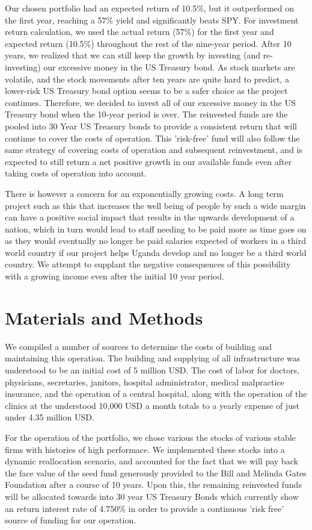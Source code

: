 \documentclass[10pt,twocolumn,twoside,final]{IEEEtran}
\begin{document}
Our chosen portfolio had an expected return of 10.5\%, but it outperformed on the first year, reaching a 57\% yield and significantly beats SPY. For investment return calculation, we used the actual return (57\%) for the first year and expected return (10.5\%) throughout the rest of the nine-year period. After 10 years, we realized that we can still keep the growth by investing (and re-investing) our excessive money in the US Treasury bond. As stock markets are volatile, and the stock movements after ten years are quite hard to predict, a lower-risk US Treasury bond option seems to be a safer choice as the project continues. Therefore, we decided to invest all of our excessive money in the US Treasury bond when the 10-year period is over. The reinvested funds are the pooled into 30 Year US Treasury bonds to provide a consistent return that will continue to cover the costs of operation. This 'risk-free' fund will also follow the same strategy of covering costs of operation and subsequent reinvestment, and is expected to still return a net positive growth in our available funds even after taking costs of operation into account.

There is however a concern for an exponentially growing costs. A long term project such as this that increases the well being of people by such a wide margin can have a positive social impact that results in the upwards development of a nation, which in turn would lead to staff needing to be paid more as time goes on as they would eventually no longer be paid salaries expected of workers in a third world country if our project helps Uganda develop and no longer be a third world country. We attempt to supplant the negative consequences of this possibility with a growing income even after the initial 10 year period.

\section{Materials and Methods}
We compiled a number of sources to determine the costs of building and maintaining this operation. The building and supplying of all infrastructure was understood to be an initial cost of 5 million USD. The cost of labor for doctors, physicians, secretaries, janitors, hospital administrator, medical malpractice insurance, and the operation of a central hospital, along with the operation of the clinics at the understood 10,000 USD a month totals to a yearly expense of just under 4.35 million USD.

For the operation of the portfolio, we chose various the stocks of various stable firms with histories of high performace. We implemented these stocks into a dynamic reallocation scenario, and accounted for the fact that we will pay back the face value of the seed fund generously provided to the Bill and Melinda Gates Foundation after a course of 10 years. Upon this, the remaining reinvested funds will be allocated towards into 30 year US Treasury Bonds which currently show an return interest rate of 4.750\% in order to provide a continuous 'risk free' source of funding for our operation. 
\end{document}
